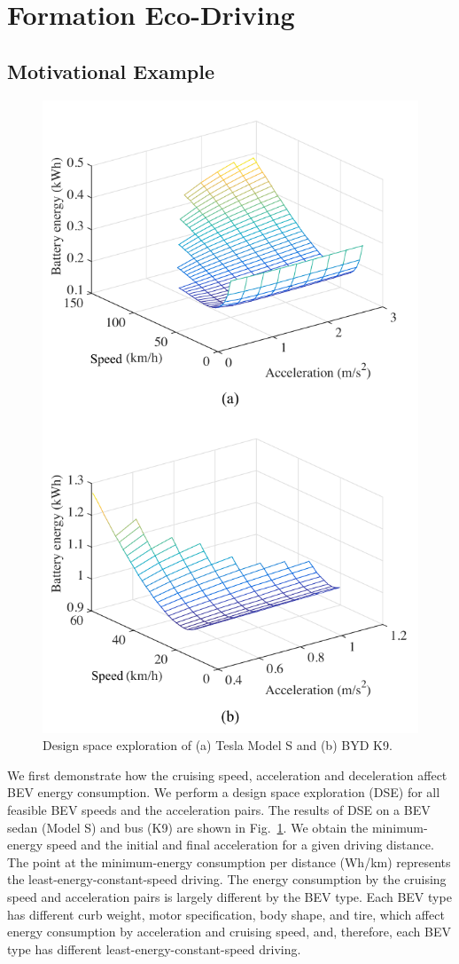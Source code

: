 \documentclass{IEEEtran}
\begin{document}
\section{Formation Eco-Driving}\label{sec:problem}

\subsection{Motivational Example}

\begin{figure}	%
\centering
\includegraphics[width=0.8\hsize]{Figures/DSE.pdf}
\caption{Design space exploration of (a) Tesla Model S and (b) BYD K9.}
\label{fig:DSE}
\end{figure} 


We first demonstrate how the cruising speed, acceleration and deceleration affect BEV energy consumption. We perform a design space exploration (DSE) for all feasible BEV speeds and the acceleration pairs. The results of DSE on a BEV sedan (Model S) and bus (K9) are shown in Fig.~\ref{fig:DSE}. 
We obtain the minimum-energy speed and the initial and final acceleration for a given driving distance. 
The point at the minimum-energy consumption per distance (Wh/km) represents the least-energy-constant-speed driving. The energy consumption by the cruising speed and acceleration pairs is largely different by the BEV type. 
Each BEV type has different curb weight, motor specification, body shape, and tire, which affect energy consumption by acceleration and cruising speed, and, therefore, each BEV type has different least-energy-constant-speed driving.
\end{document}
